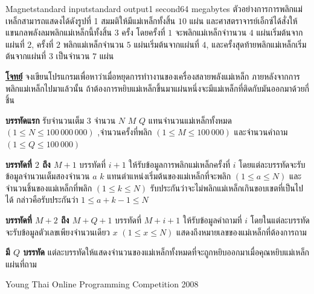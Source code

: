 \documentclass[11pt,a4paper]{article}
\begin{document}
\begin{problem}{Magnet}{standard input}{standard output}{1 second}{64 megabytes}
ตัวอย่างการการพลิกแม่เหล็กสามารถแสดงได้ดังรูปที่ 1 สมมติให้มีแม่เหล็กทั้งสิ้น $10$ แผ่น และศาสตราจารย์เอ็กซ์ได้สั่งให้แขนกลพลังลมพลิกแม่เหล็กนี้ทั้งสิ้น $3$ ครั้ง โดยครั้งที่ $1$ จะพลิกแม่เหล็กจำานวน $4$ แผ่นเริ่มต้นจากแผ่นที่ $2$, ครั้งที่ $2$ พลิกแม่เหล็กจำนวน $5$ แผ่นเริ่มต้นจากแผ่นที่ $4$, และครั้งสุดท้ายพลิกแม่เหล็กเริ่มต้นจากแผ่นที่ $3$ เป็นจำนวน $7$ แผ่น

\bigskip
\underline{\textbf{โจทย์}}  จงเขียนโปรแกรมเพื่อหาว่าเมื่อหยุดการทำางานของเครื่องสลายพลังแม่เหล็ก ภายหลังจากการพลิกแม่เหล็กไปมาแล้วนั้น ถ้าต้องการหยิบแม่เหล็กขึ้นมาแผ่นหนึ่งจะมีแม่เหล็กที่ติดกับมันออกมาด้วยกี่ชิ้น


\InputFile

\textbf{บรรทัดแรก} รับจำนวนเต็ม $3$ จำนวน $N$ $M$ $Q$  แทนจำนวนแม่เหล็กทั้งหมด $(1 \leq N \leq 100\,000\,000)$ ,จำนวนครั้งที่พลิก $(1 \leq M \leq 100\,000)$ และจำนวนคำถาม $(1 \leq Q \leq 100\,000)$

\textbf{บรรทัดที่ $2$ ถึง $M+1$} บรรทัดที่ $i+1$ ให้รับข้อมูลการพลิกแม่เหล็กครั้งที่ $i$ โดยแต่ละบรรทัดจะรับข้อมูลจำนวนเต็มสองจำนวน $a$ $k$ แทนตำแหน่งเริ่มต้นของแม่เหล็กที่จะพลิก $(1 \leq a \leq N)$ และจำนวนชิ้นของแม่เหล็กที่พลิก $(1 \leq k \leq N)$ รับประกันว่าจะไม่พลิกแม่เหล็กเกินขอบเขตที่เป็นไปได้ กล่าวคือรับประกันว่า $1 \leq a+k-1 \leq N$

\textbf{บรรทัดที่ $M+2$ ถึง $M+Q+1$} บรรทัดที่ $M+i+1$ ให้รับข้อมูลคำถามที่ $i$ โดยในแต่ละบรรทัดจะรับข้อมูลตัวเลขเพียงจำนวนเดียว $x$ $(1 \leq x \leq N)$ แสดงถึงหมายเลขของแม่เหล็กที่ต้องการถาม

\OutputFile

\textbf{มี $Q$ บรรทัด} แต่ละบรรทัดให้แสดงจำนวนของแม่เหล็กทั้งหมดที่จะถูกหยิบออกมาเมื่อคุณหยิบแม่เหล็กแผ่นที่ถาม



\Examples

\begin{example}
%
\end{example}


\Source

Young Thai Online Programming Competition 2008

\end{problem}
\end{document}
